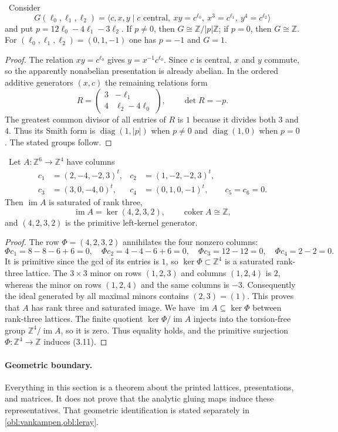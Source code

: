 \begin{proposition}
\label{prop:terminal-group}
\Verified\ Consider
\[
G(\ell_0,\ell_1,\ell_2)=
\langle c,x,y\mid c\text{ central},\
xy=c^{\ell_0},\ x^3=c^{\ell_1},\ y^4=c^{\ell_2}\rangle
\]
and put $p=12\ell_0-4\ell_1-3\ell_2$.  If $p\ne0$, then
$G\cong\mathbb Z/|p|\mathbb Z$; if $p=0$, then $G\cong\mathbb Z$.
For $(\ell_0,\ell_1,\ell_2)=(0,1,-1)$ one has $p=-1$ and $G=1$.
\end{proposition}

\begin{proof}
The relation $xy=c^{\ell_0}$ gives $y=x^{-1}c^{\ell_0}$.  Since $c$ is
central, $x$ and $y$ commute, so the apparently nonabelian presentation is
already abelian.  In the ordered additive generators $(x,c)$ the remaining
relations form
\[
R=\begin{pmatrix}3&-\ell_1\\4&\ell_2-4\ell_0\end{pmatrix},
\qquad \det R=-p.
\]
The greatest common divisor of all entries of $R$ is $1$ because it divides
both $3$ and $4$.  Thus its Smith form is
$\operatorname{diag}(1,|p|)$ when $p\ne0$ and
$\operatorname{diag}(1,0)$ when $p=0$.  The stated groups follow.
\end{proof}

\begin{proposition}
\label{prop:terminal-degree-two}
\Verified\ Let $A:\mathbb Z^6\to\mathbb Z^4$ have columns
\[
\begin{aligned}
c_1&=(2,-4,-2,3)^t,&c_2&=(1,-2,-2,3)^t,\\
c_3&=(3,0,-4,0)^t,&c_4&=(0,1,0,-1)^t,
\qquad c_5=c_6=0.
\end{aligned}
\]
Then $\operatorname{im}A$ is saturated of rank three,
\[
\operatorname{im}A=\ker(4,2,3,2),
\qquad
\operatorname{coker}A\cong\mathbb Z,
\tag{3.11}
\]
and $(4,2,3,2)$ is the primitive left-kernel generator.
\end{proposition}

\begin{proof}
The row $\Phi=(4,2,3,2)$ annihilates the four nonzero columns:
\[
\Phi c_1=8-8-6+6=0,\quad
\Phi c_2=4-4-6+6=0,\quad
\Phi c_3=12-12=0,\quad
\Phi c_4=2-2=0.
\]
It is primitive since the gcd of its entries is $1$, so
$\ker\Phi\subset\mathbb Z^4$ is a saturated rank-three lattice.
The $3\times3$ minor on rows $(1,2,3)$ and columns $(1,2,4)$ is $2$,
whereas the minor on rows $(1,2,4)$ and the same columns is $-3$.
Consequently the ideal generated by all maximal minors contains $(2,3)=(1)$.
This proves that $A$ has rank three and saturated image.  We have
$\operatorname{im}A\subseteq\ker\Phi$ between rank-three lattices.
The finite quotient $\ker\Phi/\operatorname{im}A$ injects into the
torsion-free group $\mathbb Z^4/\operatorname{im}A$, so it is zero.
Thus equality holds, and the primitive surjection $\Phi:\mathbb Z^4\to
\mathbb Z$ induces (3.11).
\end{proof}

\paragraph{Geometric boundary.}
Everything in this section is a theorem about the printed lattices,
presentations, and matrices.  It does not prove that the analytic gluing maps
induce these representatives.  That geometric identification is stated
separately in \cref{obl:vankampen,obl:leray}.

